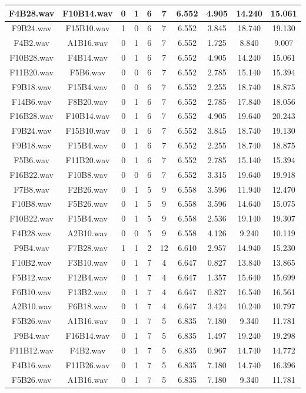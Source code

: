 \documentclass[11pt,a4paper,twoside]{book}
\begin{document}
\begin{longtable}[c]{|c|c|c|c|c|c|c|c|c|c|}
F4B28.wav&F10B14.wav&0&1&6&7&6.552&4.905&14.240&15.061\\ \hline
F9B24.wav&F15B10.wav&1&0&6&7&6.552&3.845&18.740&19.130\\ \hline
F4B2.wav&A1B16.wav&0&1&6&7&6.552&1.725&8.840&9.007\\ \hline
F10B28.wav&F4B14.wav&0&1&6&7&6.552&4.905&14.240&15.061\\ \hline
F11B20.wav&F5B6.wav&0&0&6&7&6.552&2.785&15.140&15.394\\ \hline
F9B18.wav&F15B4.wav&0&0&6&7&6.552&2.255&18.740&18.875\\ \hline
F14B6.wav&F8B20.wav&0&1&6&7&6.552&2.785&17.840&18.056\\ \hline
F16B28.wav&F10B14.wav&0&1&6&7&6.552&4.905&19.640&20.243\\ \hline
F9B24.wav&F15B10.wav&0&1&6&7&6.552&3.845&18.740&19.130\\ \hline
F9B18.wav&F15B4.wav&0&1&6&7&6.552&2.255&18.740&18.875\\ \hline
F5B6.wav&F11B20.wav&0&1&6&7&6.552&2.785&15.140&15.394\\ \hline
F16B22.wav&F10B8.wav&0&0&6&7&6.552&3.315&19.640&19.918\\ \hline
F7B8.wav&F2B26.wav&0&1&5&9&6.558&3.596&11.940&12.470\\ \hline
F10B8.wav&F5B26.wav&0&1&5&9&6.558&3.596&14.640&15.075\\ \hline
F10B22.wav&F15B4.wav&0&1&5&9&6.558&2.536&19.140&19.307\\ \hline
F4B28.wav&A2B10.wav&0&0&5&9&6.558&4.126&9.240&10.119\\ \hline
F9B4.wav&F7B28.wav&1&1&2&12&6.610&2.957&14.940&15.230\\ \hline
F10B2.wav&F3B10.wav&0&1&7&4&6.647&0.827&13.840&13.865\\ \hline
F5B12.wav&F12B4.wav&0&1&7&4&6.647&1.357&15.640&15.699\\ \hline
F6B10.wav&F13B2.wav&0&1&7&4&6.647&0.827&16.540&16.561\\ \hline
A2B10.wav&F6B18.wav&0&1&7&4&6.647&3.424&10.240&10.797\\ \hline
F5B26.wav&A1B16.wav&0&1&7&5&6.835&7.180&9.340&11.781\\ \hline
F9B4.wav&F16B14.wav&0&1&7&5&6.835&1.497&19.240&19.298\\ \hline
F11B12.wav&F4B2.wav&0&1&7&5&6.835&0.967&14.740&14.772\\ \hline
F4B16.wav&F11B26.wav&0&1&7&5&6.835&7.180&14.740&16.396\\ \hline
F5B26.wav&A1B16.wav&0&1&7&5&6.835&7.180&9.340&11.781\\ \hline

\end{longtable}
\end{document}
